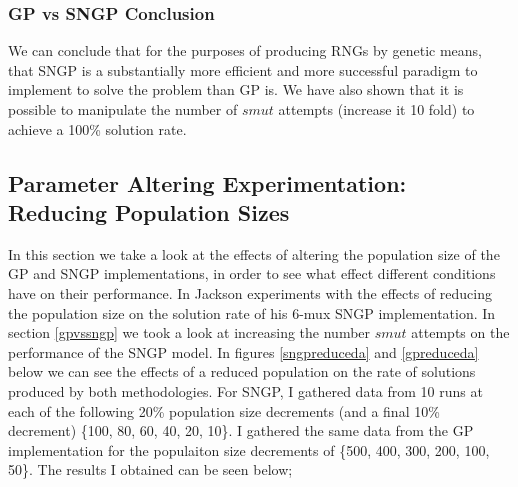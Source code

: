 \documentclass[a4paper,10.5pt]{article}
\begin{document}
\subsubsection{GP vs SNGP Conclusion}
We can conclude that for the purposes of producing RNGs by genetic means, that SNGP is a substantially more efficient and more successful paradigm to implement to solve the problem than GP is. We have also shown that it is possible to manipulate the number of $smut$ attempts (increase it 10 fold) to achieve a 100\% solution rate.

\newpage
\subsection{Parameter Altering Experimentation: Reducing Population Sizes}
In this section we take a look at the effects of altering the population size of the GP and SNGP implementations, in order to see what effect different conditions have on their performance. In \cite[p.56]{jacksonsngp} Jackson experiments with the effects of reducing the population size on the solution rate of his 6-mux SNGP implementation. In section \ref{gpvssngp} we took a look at increasing the number $smut$ attempts on the performance of the SNGP model. In figures \ref{sngpreduceda} and \ref{gpreduceda} below we can see the effects of a reduced population on the rate of solutions produced by both methodologies. For SNGP, I gathered data from 10 runs at each of the following 20\% population size decrements (and a final 10\% decrement) \{100, 80, 60, 40, 20, 10\}. I gathered the same data from the GP implementation for the populaiton size decrements of \{500, 400, 300, 200, 100, 50\}. The results I obtained can be seen below;
\end{document}
